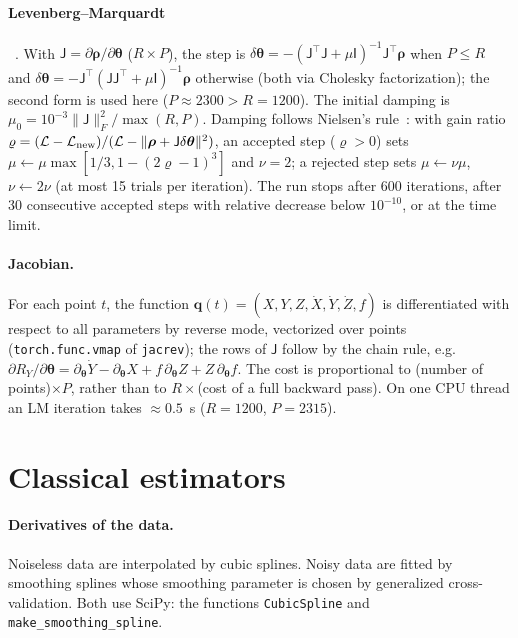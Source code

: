 \documentclass[aps,pra,onecolumn,superscriptaddress,11pt,longbibliography,floatfix,nofootinbib]{revtex4-2}
\begin{document}
\paragraph{Levenberg--Marquardt}~\cite{levenberg1944,marquardt1963}. With $\mathsf J=\partial\bm\rho/
\partial\bm\theta$ ($R\times P$), the step is
$\delta\bm\theta=-(\mathsf J^{\top}\mathsf J+\mu\mathsf I)^{-1}\mathsf J^{\top}\bm\rho$ when $P\le R$ and
$\delta\bm\theta=-\mathsf J^{\top}(\mathsf J\mathsf J^{\top}+\mu\mathsf I)^{-1}\bm\rho$ otherwise
(both via Cholesky factorization); the second form is used here ($P\approx2300>R=1200$). The initial
damping is $\mu_0=10^{-3}\|\mathsf J\|_F^2/\max(R,P)$. Damping follows Nielsen's rule~\cite{nielsen1999damping}:
with gain ratio $\varrho=(\mathcal L-\mathcal L_{\rm new})/(\mathcal L-\|\bm\rho+\mathsf J\delta\bm\theta\|^2)$,
an accepted step ($\varrho>0$) sets $\mu\leftarrow\mu\max[1/3,1-(2\varrho-1)^3]$ and $\nu=2$; a rejected step
sets $\mu\leftarrow\nu\mu$, $\nu\leftarrow2\nu$ (at most 15 trials per iteration). The run stops after 600
iterations, after 30 consecutive accepted steps with relative decrease below $10^{-10}$, or at the time
limit.

\paragraph{Jacobian.} For each point $t$, the function $\bm q(t)=(X,Y,Z,\dot X,\dot Y,\dot Z,f)$ is
differentiated with respect to all parameters by reverse mode, vectorized over points
(\texttt{torch.func.vmap} of \texttt{jacrev}); the rows of $\mathsf J$ follow by the chain rule, e.g.\
$\partial R_Y/\partial\bm\theta=\partial_{\bm\theta}\dot Y-\partial_{\bm\theta}X+f\,\partial_{\bm\theta}Z
+Z\,\partial_{\bm\theta}f$. The cost is proportional to (number of points)$\times P$, rather than to
$R\times$(cost of a full backward pass). On one CPU thread an LM iteration takes $\approx0.5$~s
($R=1200$, $P=2315$).

\section{Classical estimators}\label{sec:classical}

\paragraph{Derivatives of the data.} Noiseless data are interpolated by cubic splines. Noisy data are
fitted by smoothing splines whose smoothing parameter is chosen by generalized cross-validation. Both
use SciPy: the functions \texttt{CubicSpline} and \texttt{make\_smoothing\_spline}.
\end{document}
